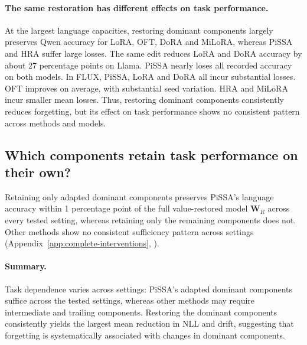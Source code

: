 \paragraph{The same restoration has different effects on task performance.}
At the largest language capacities, restoring dominant components largely preserves Qwen accuracy for LoRA, OFT, DoRA and MiLoRA, whereas PiSSA and HRA suffer large losses. The same edit reduces LoRA and DoRA accuracy by about 27 percentage points on Llama. PiSSA nearly loses all recorded accuracy on both models. In FLUX, PiSSA, LoRA and DoRA all incur substantial losses. OFT improves on average, with substantial seed variation. HRA and MiLoRA incur smaller mean losses. Thus, restoring dominant components consistently reduces forgetting, but its effect on task performance shows no consistent pattern across methods and models.

\subsection{Which components retain task performance on their own?}
Retaining only adapted dominant components preserves PiSSA's language accuracy within 1 percentage point of the full value-restored model $\bm W_R$ across every tested setting, whereas retaining only the remaining components does not. Other methods show no consistent sufficiency pattern across settings (Appendix~\ref{app:complete-interventions}, ).

\paragraph{Summary.}
Task dependence varies across settings: PiSSA’s adapted dominant components suffice across the tested settings, whereas other methods may require intermediate and trailing components. Restoring the dominant components consistently yields the largest mean reduction in NLL and drift, suggesting that forgetting is systematically associated with changes in dominant components.
